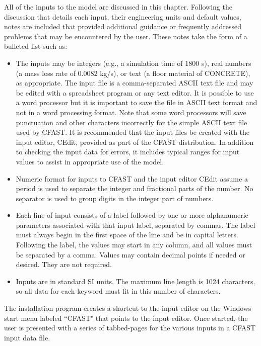 All of the inputs to the model are discussed in this chapter.  Following the discussion that details each input, their engineering units and default values, notes are included that provided additional guidance or frequently addressed problems that may be encountered by the user. These notes take the form of a bulleted list such as:

\begin{itemize}
\item The inputs may be integers (e.g., a simulation time of 1800 s), real numbers (a mass loss rate of 0.0082 kg/s), or text (a floor material of CONCRETE), as appropriate. The input file is a comma-separated ASCII text file and may be edited with a spreadsheet program or any text editor. It is possible to use a word processor but it is important to save the file in ASCII text format and not in a word processing format. Note that some word processors will save punctuation and other characters incorrectly for the simple ASCII text file used by CFAST. It is recommended that the input files be created with the input editor, CEdit, provided as part of the CFAST distribution.  In addition to checking the input data for errors, it includes typical ranges for input values to assist in appropriate use of the model.

\item Numeric format for inputs to CFAST and the input editor CEdit assume a period is used to separate the integer and fractional parts of the number. No separator is used to group digits in the integer part of numbers.

\item Each line of input consists of a label followed by one or more alphanumeric parameters associated with that input label, separated by commas.  The label must always begin in the first space of the line and be in capital letters.  Following the label, the values may start in any column, and all values must be separated by a comma.  Values may contain decimal points if needed or desired.  They are not required.

\item Inputs are in standard SI units.  The maximum line length is 1024 characters, so all data for each keyword must fit in this number of characters.
\end{itemize}

The installation program creates a shortcut to the input editor on the Windows start menu labeled ``CFAST" that points to the input editor.  Once started, the user is presented with a series of tabbed-pages for the various inputs in a CFAST input data file.

